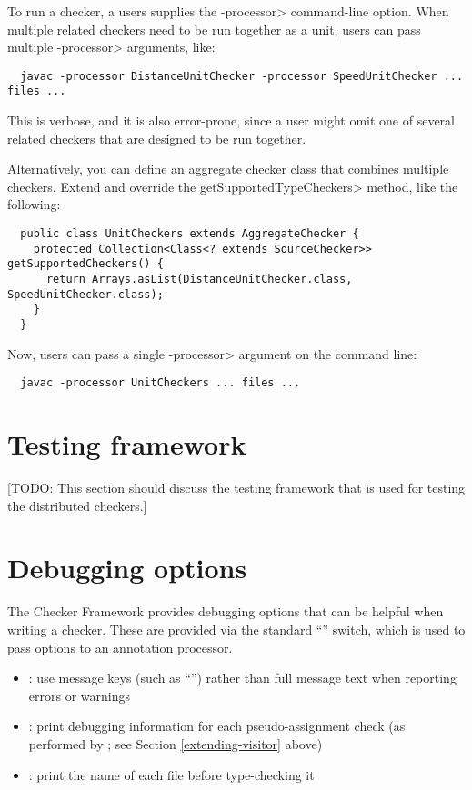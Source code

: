 To run a checker, a 
users supplies the 
\<-processor>  command-line option.  When multiple related
checkers need to be run together as a unit, users can pass
multiple \<-processor> arguments, like:

\begin{Verbatim}
  javac -processor DistanceUnitChecker -processor SpeedUnitChecker ... files ...
\end{Verbatim}

\noindent
This is verbose, and it is also error-prone, since a user might omit one of
several related checkers that are designed to be run together.

Alternatively, you can define an aggregate checker class that combines
multiple checkers.  Extend  and override
the \<getSupportedTypeCheckers> method, like the following:

\begin{Verbatim}
  public class UnitCheckers extends AggregateChecker {
    protected Collection<Class<? extends SourceChecker>> getSupportedCheckers() {
      return Arrays.asList(DistanceUnitChecker.class, SpeedUnitChecker.class);
    }
  }
\end{Verbatim}

\noindent
Now, users can pass a single \<-processor> argument on the command line:

\begin{Verbatim}
  javac -processor UnitCheckers ... files ...
\end{Verbatim}


\section{Testing framework\label{testing-framework}}

[TODO: This section should discuss the testing framework that is used for
testing the distributed checkers.]


\section{Debugging options\label{debugging-options}}

The Checker Framework provides debugging options that can be helpful when
writing a checker. These are provided via the standard  ``''
switch, which is used to pass options to an annotation processor.

\begin{itemize}

\item {}: use message keys (such as ``'')
rather than full message text when reporting errors or warnings

\item {}: print debugging information for each
pseudo-assignment check (as performed by ; see Section
\ref{extending-visitor} above)

\item {}: print the name of each file before type-checking it

\end{itemize}

